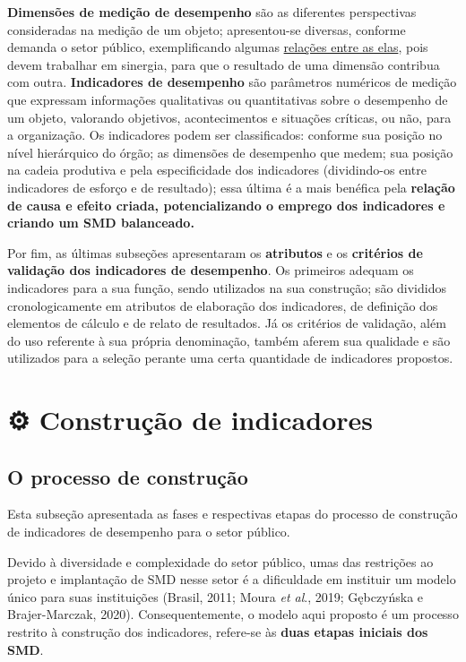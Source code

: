 \documentclass[
  letterpaper,
  DIV=11,
  numbers=noendperiod]{scrreprt}
\begin{document}
\textbf{Dimensões de medição de desempenho} são as diferentes
perspectivas consideradas na medição de um objeto; apresentou-se
diversas, conforme demanda o setor público, exemplificando algumas
\href{/o/AZWDclIWFqqJuBEvyQWk/s/ws6bIBOPv2tLRHdwbB7y/2.-fundamentos-teoricos/2.2-dimensoes-de-medicao-de-desempenho-no-setor-publico\#ambientes-algumas-relacoes-entre-as-dimensoes-de-medicao-de-desempenho}{relações
entre as elas}, pois devem trabalhar em sinergia, para que o resultado
de uma dimensão contribua com outra. \textbf{Indicadores de desempenho}
são parâmetros numéricos de medição que expressam informações
qualitativas ou quantitativas sobre o desempenho de um objeto, valorando
objetivos, acontecimentos e situações críticas, ou não, para a
organização. Os indicadores podem ser classificados: conforme sua
posição no nível hierárquico do órgão; as dimensões de desempenho que
medem; sua posição na cadeia produtiva e pela especificidade dos
indicadores (dividindo-os entre indicadores de esforço e de resultado);
essa última é a mais benéfica pela \textbf{relação de causa e efeito
criada, potencializando o emprego dos indicadores e criando um SMD
balanceado.}

Por fim, as últimas subseções apresentaram os \textbf{atributos} e os
\textbf{critérios de validação dos indicadores de desempenho}. Os
primeiros adequam os indicadores para a sua função, sendo utilizados na
sua construção; são divididos cronologicamente em atributos de
elaboração dos indicadores, de definição dos elementos de cálculo e de
relato de resultados. Já os critérios de validação, além do uso
referente à sua própria denominação, também aferem sua qualidade e são
utilizados para a seleção perante uma certa quantidade de indicadores
propostos.

\part{⚙️ Construção de indicadores}

\hypertarget{o-processo-de-construuxe7uxe3o}{%
\chapter{O processo de
construção}\label{o-processo-de-construuxe7uxe3o}}

{Esta subseção apresentada as fases e respectivas etapas do processo de
construção de indicadores de desempenho para o setor público.}

Devido à diversidade e complexidade do setor público, umas das
restrições ao projeto e implantação de SMD nesse setor é a dificuldade
em instituir um modelo único para suas instituições (Brasil, 2011; Moura
\emph{et al}., 2019; Gębczyńska e Brajer-Marczak, 2020).
Consequentemente, o modelo aqui proposto é um processo restrito à
construção dos indicadores, refere-se às \textbf{duas etapas iniciais
dos SMD}.
\end{document}

